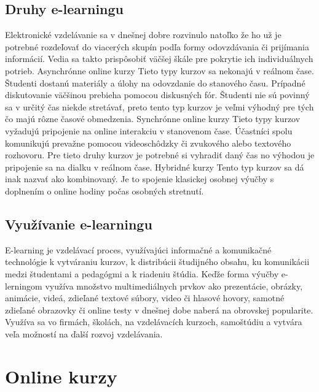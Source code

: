 \documentclass[10pt,twoside,slovak,a4paper]{article}
\begin{document}
\subsection{Druhy e-learningu} \label{druhy}

Elektronické vzdelávanie sa v dnešnej dobre rozvinulo natoľko že ho už je potrebné rozdeľovať do viacerých skupín podľa formy odovzdávania či prijímania informácií. Vedia sa takto prispôsobiť väčšej škále pre pokrytie ich individuálnych potrieb. 
Asynchrónne online kurzy
Tieto typy kurzov sa nekonajú v reálnom čase. Študenti dostanú materiály a úlohy na odovzdanie do stanového času. Prípadné diskutovanie väčšinou prebieha pomocou diskusných fór. Študenti nie sú povinný sa v určitý čas niekde stretávať, preto tento typ kurzov je veľmi výhodný pre tých čo majú rôzne časové obmedzenia.
Synchrónne online kurzy
Tieto typy kurzov vyžadujú pripojenie na online interakciu v stanovenom čase. Účastníci spolu komunikujú prevažne pomocou videoschôdzky či zvukového alebo textového rozhovoru. Pre tieto druhy kurzov je potrebné si vyhradiť daný čas no výhodou je pripojenie sa na dialku v reálnom čase.
Hybridné kurzy
Tento typ kurzov sa dá inak nazvať ako kombinovaný. Je to spojenie klasickej osobnej výučby s doplnením o online hodiny počas osobných stretnutí. 

\subsection{Využívanie e-learningu} \label{vyuzitie}

E-learning je vzdelávací proces, využívajúci informačné a komunikačné technológie k vytváraniu kurzov, k distribúcii študijného obsahu, ku komunikácii medzi študentami a pedagógmi a k riadeniu štúdia.
Keďže forma výučby e-lerningom využíva množstvo multimediálnych prvkov ako prezentácie, obrázky, animácie, videá, zdieľané textové súbory, video či hlasové hovory, samotné zdieľané obrazovky či online testy v dnešnej dobe naberá na obrovskej popularite. Využíva sa vo firmách, školách, na vzdelávacích kurzoch, samoštúdiu a vytvára veľa možností na ďalší rozvoj vzdelávania. 






\section{Online kurzy} \label{kurzy}
\end{document}
